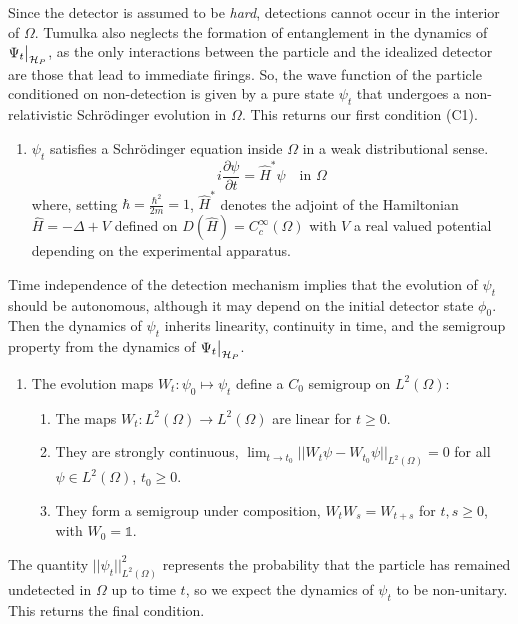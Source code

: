 \documentclass{article}
\numberwithin{equation}{section}
\begin{document}
\par
Since the detector is assumed to be \textit{hard}, detections cannot occur in the interior of $\Omega$. Tumulka also neglects the formation of entanglement in the dynamics of $\Psi_t \big{|}_{\mathcal{H}_P}$, as the only interactions between the particle and the idealized detector are those that lead to immediate firings. So, the wave function of the particle conditioned on non-detection is given by a pure state $\psi_t$ that undergoes a non-relativistic Schr\"odinger evolution in $\Omega$. This returns our first condition (C1).
\begin{enumerate}
    \item[(C1)] $\psi_t$ satisfies a Schr\"odinger equation inside $\Omega$ in a weak distributional sense.
    \begin{equation}\label{Intro Evo Eq}
        i \frac{\partial \psi}{\partial t}= \hat{H}^*\psi \quad \text{in }\Omega
    \end{equation}
    where, setting $\hbar=\frac{\hbar^2}{2m}=1$, $\hat{H}^*$ denotes the adjoint of the Hamiltonian $\hat{H}=-\Delta+V$ defined on $D(\hat{H})=C_c^\infty(\Omega)$ with $V$ a real valued potential depending on the experimental apparatus. 
\end{enumerate}
Time independence of the detection mechanism implies that the evolution of $\psi_t$ should be autonomous, although it may depend on the initial detector state $\phi_0$. Then the dynamics of $\psi_t$ inherits linearity, continuity in time, and the semigroup property from the dynamics of $\Psi_t\big{|}_{\mathcal{H}_P}$.
\begin{enumerate}
    \item[(C2)] The evolution maps $W_t:\psi_0 \mapsto\psi_t$ define a $C_0$ semigroup on $L^2(\Omega)$:
    \begin{enumerate}
        \item The maps $W_t:L^2(\Omega)\to L^2(\Omega)$ are linear for $t \geq 0$.
        \item They are strongly continuous,   $\lim_{t \to t_0}||W_t \psi - W_{t_0}\psi||_{L^2(\Omega)}=0$ for all $\psi \in L^2(\Omega)$, $t_0 \geq 0$.
        \item They form a semigroup under composition, $W_t W_s= W_{t+s}$ for $t,s \geq 0$, with $W_0=\mathds{1}$. 
    \end{enumerate}
\end{enumerate}
The quantity $||\psi_t||_{L^2(\Omega)}^2$ represents the probability that the particle has remained undetected in $\Omega$ up to time $t$, so we expect the dynamics of $\psi_t$ to be non-unitary. This returns the final condition.
\end{document}
